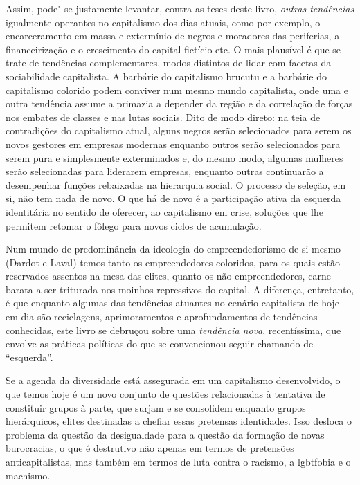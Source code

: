 Assim, pode"-se justamente levantar, contra as teses deste livro,
\emph{outras tendências} igualmente operantes no capitalismo dos dias
atuais, como por exemplo, o encarceramento em massa e extermínio de
negros e moradores das periferias, a financeirização e o crescimento do
capital fictício etc. O mais plausível é que se trate de tendências
complementares, modos distintos de lidar com facetas da sociabilidade
capitalista. A barbárie do capitalismo brucutu e a barbárie do
capitalismo colorido podem conviver num mesmo mundo capitalista, onde
uma e outra tendência assume a primazia a depender da região e da
correlação de forças nos embates de classes e nas lutas sociais. Dito de
modo direto: na teia de contradições do capitalismo atual, alguns negros
serão selecionados para serem os novos gestores em empresas modernas
enquanto outros serão selecionados para serem pura e simplesmente
exterminados e, do mesmo modo, algumas mulheres serão selecionadas para
liderarem empresas, enquanto outras continuarão a desempenhar funções
rebaixadas na hierarquia social. O processo de seleção, em si, não tem
nada de novo. O que há de novo é a participação ativa da esquerda
identitária no sentido de oferecer, ao capitalismo em crise, soluções
que lhe permitem retomar o fôlego para novos ciclos de acumulação.

Num mundo de predominância da ideologia do empreendedorismo de si mesmo
(Dardot e Laval) temos tanto os empreendedores coloridos, para os quais
estão reservados assentos na mesa das elites, quanto os não
empreendedores, carne barata a ser triturada nos moinhos repressivos do
capital. A diferença, entretanto, é que enquanto algumas das tendências
atuantes no cenário capitalista de hoje em dia são reciclagens,
aprimoramentos e aprofundamentos de tendências conhecidas, este livro se
debruçou sobre uma \emph{tendência nova}, recentíssima, que envolve as
práticas políticas do que se convencionou seguir chamando de
``esquerda''.

Se a agenda da diversidade está assegurada em um capitalismo
desenvolvido, o que temos hoje é um novo conjunto de questões
relacionadas à tentativa de constituir grupos à parte, que surjam e se
consolidem enquanto grupos hierárquicos, elites destinadas a chefiar
essas pretensas identidades. Isso desloca o problema da questão da
desigualdade para a questão da formação de novas burocracias, o que é
destrutivo não apenas em termos de pretensões anticapitalistas, mas
também em termos de luta contra o racismo, a lgbtfobia e o machismo.

